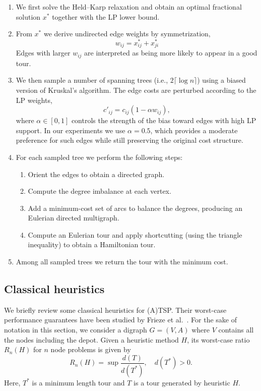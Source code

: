 \documentclass[12pt]{report}
\theoremstyle{definition}
\begin{document}
\begin{enumerate}
\item We first solve the Held--Karp relaxation and obtain an optimal fractional solution $x^*$ together with the LP lower bound.
\item From $x^*$ we derive undirected edge weights by symmetrization,
\[
w_{ij} = x^*_{ij} + x^*_{ji}
\]
Edges with larger $w_{ij}$ are interpreted as being more likely to appear in a good tour.
\item We then sample a number of spanning trees (i.e., $2\lceil\log n\rceil$) using a biased version of Kruskal's algorithm. The edge costs are perturbed according to the LP weights,
\[
c'_{ij} = c_{ij}(1-\alpha w_{ij}),
\]
where $\alpha\in[0,1]$ controls the strength of the bias toward edges with high LP support. In our experiments we use $\alpha = 0.5$, which provides a moderate preference for such edges while still preserving the original cost structure.

\item For each sampled tree we perform the following steps:
\begin{enumerate}
    \item Orient the edges to obtain a directed graph.
    \item Compute the degree imbalance at each vertex.
    \item Add a minimum-cost set of arcs to balance the degrees,
    producing an Eulerian directed multigraph.
    \item Compute an Eulerian tour and apply shortcutting (using the triangle inequality) to obtain a Hamiltonian tour.
\end{enumerate}
\item Among all sampled trees we return the tour with the minimum cost.
\end{enumerate}

\subsection{Classical heuristics}
We briefly review some classical heuristics for (A)TSP. Their worst-case performance guarantees have been studied by Frieze et al.~\cite{frieze1982}. For the sake of notation in this section, we consider a digraph \(G= (V,A)\) where $V$ contains all the nodes including the depot. Given a heuristic method $H$, its worst-case ratio $R_n(H)$ for $n$ node problems is given by
\[
R_n(H) = \sup \frac{d(T)}{d(T^*)}, \quad d(T^*)>0.
\]
Here, $T^*$ is a minimum length tour and $T$ is a tour generated by heuristic $H$.
\end{document}
